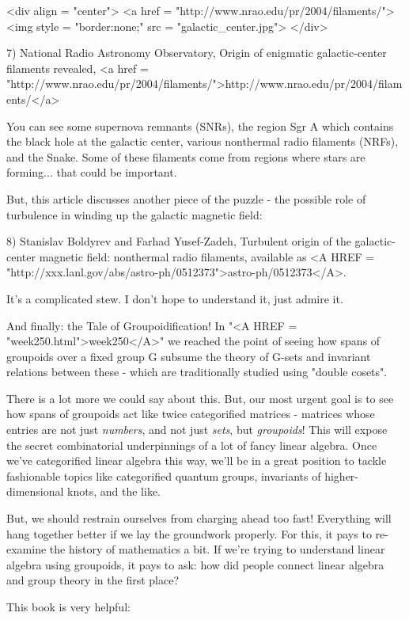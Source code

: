<div align = "center">
<a href = "http://www.nrao.edu/pr/2004/filaments/">
<img style = "border:none;" src = "galactic_center.jpg">
</div>

7) National Radio Astronomy Observatory, Origin of enigmatic galactic-center filaments revealed, <a href = "http://www.nrao.edu/pr/2004/filaments/">http://www.nrao.edu/pr/2004/filaments/</a>

You can see some supernova remnants (SNRs), the region Sgr A which
contains the black hole at the galactic center, various nonthermal 
radio filaments (NRFs), and the Snake.  Some of these filaments 
come from regions where stars are forming... that could be important.

But, this article discusses another piece of the puzzle - the possible 
role of turbulence in winding up the galactic magnetic field: 

8) Stanislav Boldyrev and Farhad Yusef-Zadeh, Turbulent origin of
the galactic-center magnetic field: nonthermal radio filaments,
available as <A HREF = "http://xxx.lanl.gov/abs/astro-ph/0512373">astro-ph/0512373</A>.

It's a complicated stew.  I don't hope to understand it, just admire it.

And finally: the Tale of Groupoidification!  In "<A HREF = "week250.html">week250</A>" we reached
the point of seeing how spans of groupoids over a fixed group G 
subsume the theory of G-sets and invariant relations between 
these - which are traditionally studied using "double cosets".  

There is a lot more we could say about this.  But, our most urgent 
goal is to see how spans of groupoids act like twice categorified 
matrices - matrices whose entries are not just \emph{numbers}, and not 
just \emph{sets}, but \emph{groupoids}!  This will expose the secret 
combinatorial underpinnings of a lot of fancy linear algebra.  Once 
we've categorified linear algebra this way, we'll be in a great 
position to tackle fashionable topics like categorified quantum groups,
invariants of higher-dimensional knots, and the like.

But, we should restrain ourselves from charging ahead too fast!  
Everything will hang together better if we lay the groundwork properly.
For this, it pays to re-examine the history of mathematics a bit.
If we're trying to understand linear algebra using groupoids, it
pays to ask: how did people connect linear algebra and group theory 
in the first place?  

This book is very helpful:


